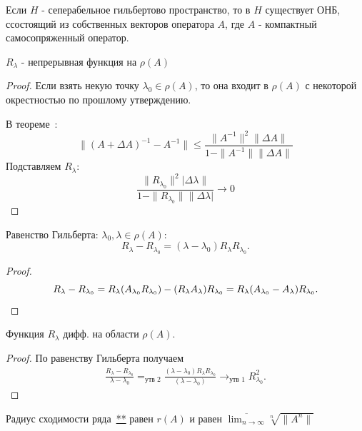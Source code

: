 \begin{theorem}\label{hilb-shmidt}
    Если $H$ - сеперабельное гильбертово пространство, то в $H$ существует ОНБ, ссостоящий из собственных векторов оператора $A$, где $A$ - компактный самосопряженный оператор.
\end{theorem}

\begin{statement}[$1$]
    $R_\lambda$ - непрерывная функция на $\rho(A)$
\end{statement}

\begin{proof}
    Если взять некую точку $\lambda_0 \in \rho(A)$, то она входит в $\rho(A)$ с некоторой окрестностью по прошлому утверждению.

    В теореме~:
    $$\|(A+\Delta A)^{-1}-A^{-1}\| \leqslant \frac{\|A^{-1}\|^2 \|\Delta A \|}{1-\|A^{-1}\| \|\Delta A\|}$$
    Подставляем $R_\lambda$:
    $$\frac{\|R_{\lambda_0} \|^2 |\Delta \lambda\|}{1 - \| R_{\lambda_0}\| \|\Delta \lambda|} \to 0$$
\end{proof}

\begin{statement}[$2$]
   Равенство Гильберта: $\lambda_0, \lambda \in \rho(A)$:
   $$R_\lambda - R_{\lambda_0} = (\lambda - \lambda_0)R_\lambda R_{\lambda_0}.$$
\end{statement}

\begin{proof}
\[
    R_\lambda - R_{\lambda_0} = \\
    R_\lambda(A_{\lambda_0} R_{\lambda_0})-(R_\lambda A_\lambda)R_{\lambda_0}=R_\lambda(A_{\lambda_0}-A_\lambda)R_{\lambda_0}.
\]
\end{proof}

\begin{statement}[$3$]
   Функция $R_\lambda$ дифф. на области $\rho(A)$.
\end{statement}

\begin{proof}
    По равенству Гильберта получаем
    \begin{align*}
        \frac{R_\lambda - R_{\lambda_0}}{\lambda - \lambda_0} =_{\text{утв 2}} \frac{(\lambda - \lambda_0)R_\lambda R_{\lambda_0}}{(\lambda - \lambda_0)} \to_{\text{утв 1}} R_{\lambda_0}^2.
    \end{align*}
\end{proof}

\begin{statement}[$4$]
    Радиус сходимости ряда~\hyperlink{thm10.1-neihman}{**} равен $r(A)$ и равен $\overline{\lim_{n \to \infty}} \sqrt[n]{\|A^n\|}$
\end{statement}

